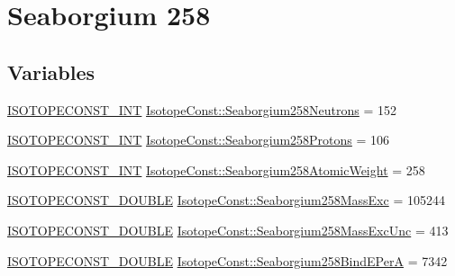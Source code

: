 \hypertarget{group___isotope_const-_seaborgium-_sg258}{}\section{Seaborgium 258}
\label{group___isotope_const-_seaborgium-_sg258}
\subsection*{Variables}
\begin{DoxyCompactItemize}
\item 
\mbox{\hyperlink{group___isotope_const-_macros_ga5f18360b3e99483a35c32d789e62621c}{I\+S\+O\+T\+O\+P\+E\+C\+O\+N\+S\+T\+\_\+\+I\+NT}} \mbox{\hyperlink{group___isotope_const-_seaborgium-_sg258_ga898e4863c96f23b25c1326d16088ab89}{Isotope\+Const\+::\+Seaborgium258\+Neutrons}} = 152
\item 
\mbox{\hyperlink{group___isotope_const-_macros_ga5f18360b3e99483a35c32d789e62621c}{I\+S\+O\+T\+O\+P\+E\+C\+O\+N\+S\+T\+\_\+\+I\+NT}} \mbox{\hyperlink{group___isotope_const-_seaborgium-_sg258_gacdeebbe0a20ed41d47529df2e0ccece8}{Isotope\+Const\+::\+Seaborgium258\+Protons}} = 106
\item 
\mbox{\hyperlink{group___isotope_const-_macros_ga5f18360b3e99483a35c32d789e62621c}{I\+S\+O\+T\+O\+P\+E\+C\+O\+N\+S\+T\+\_\+\+I\+NT}} \mbox{\hyperlink{group___isotope_const-_seaborgium-_sg258_gae6ea6c8f312a15444a366aa0a2281348}{Isotope\+Const\+::\+Seaborgium258\+Atomic\+Weight}} = 258
\item 
\mbox{\hyperlink{group___isotope_const-_macros_ga8f45a7272ce02c0b4c65c44636ed719a}{I\+S\+O\+T\+O\+P\+E\+C\+O\+N\+S\+T\+\_\+\+D\+O\+U\+B\+LE}} \mbox{\hyperlink{group___isotope_const-_seaborgium-_sg258_ga57491e59bef7dc6b41bfb0c2bc66e170}{Isotope\+Const\+::\+Seaborgium258\+Mass\+Exc}} = 105244
\item 
\mbox{\hyperlink{group___isotope_const-_macros_ga8f45a7272ce02c0b4c65c44636ed719a}{I\+S\+O\+T\+O\+P\+E\+C\+O\+N\+S\+T\+\_\+\+D\+O\+U\+B\+LE}} \mbox{\hyperlink{group___isotope_const-_seaborgium-_sg258_ga741cf158c4c2cbb8ee8b8636fc89e79b}{Isotope\+Const\+::\+Seaborgium258\+Mass\+Exc\+Unc}} = 413
\item 
\mbox{\hyperlink{group___isotope_const-_macros_ga8f45a7272ce02c0b4c65c44636ed719a}{I\+S\+O\+T\+O\+P\+E\+C\+O\+N\+S\+T\+\_\+\+D\+O\+U\+B\+LE}} \mbox{\hyperlink{group___isotope_const-_seaborgium-_sg258_gae399d6ed4a88933adcfa6ccc3decb861}{Isotope\+Const\+::\+Seaborgium258\+Bind\+E\+PerA}} = 7342
\item 

\end{DoxyCompactItemize}

